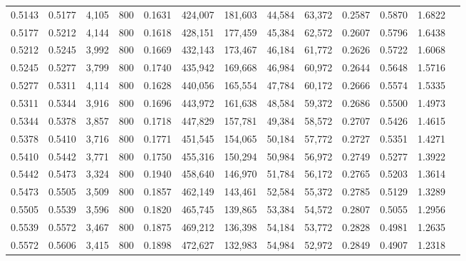 \begin{tabular}{rrrrrrrrrrrrr}
0.5143 & 0.5177 &  4,105 & 800 &                                     0.1631 & 424,007 & 181,603 &  44,584 &  63,372 & 0.2587 & 0.5870 & 1.6822 \\
0.5177 & 0.5212 &  4,144 & 800 &                                     0.1618 & 428,151 & 177,459 &  45,384 &  62,572 & 0.2607 & 0.5796 & 1.6438 \\
0.5212 & 0.5245 &  3,992 & 800 &                                     0.1669 & 432,143 & 173,467 &  46,184 &  61,772 & 0.2626 & 0.5722 & 1.6068 \\
0.5245 & 0.5277 &  3,799 & 800 &                                     0.1740 & 435,942 & 169,668 &  46,984 &  60,972 & 0.2644 & 0.5648 & 1.5716 \\
0.5277 & 0.5311 &  4,114 & 800 &                                     0.1628 & 440,056 & 165,554 &  47,784 &  60,172 & 0.2666 & 0.5574 & 1.5335 \\
0.5311 & 0.5344 &  3,916 & 800 &                                     0.1696 & 443,972 & 161,638 &  48,584 &  59,372 & 0.2686 & 0.5500 & 1.4973 \\
0.5344 & 0.5378 &  3,857 & 800 &                                     0.1718 & 447,829 & 157,781 &  49,384 &  58,572 & 0.2707 & 0.5426 & 1.4615 \\
0.5378 & 0.5410 &  3,716 & 800 &                                     0.1771 & 451,545 & 154,065 &  50,184 &  57,772 & 0.2727 & 0.5351 & 1.4271 \\
0.5410 & 0.5442 &  3,771 & 800 &                                     0.1750 & 455,316 & 150,294 &  50,984 &  56,972 & 0.2749 & 0.5277 & 1.3922 \\
0.5442 & 0.5473 &  3,324 & 800 &                                     0.1940 & 458,640 & 146,970 &  51,784 &  56,172 & 0.2765 & 0.5203 & 1.3614 \\
0.5473 & 0.5505 &  3,509 & 800 &                                     0.1857 & 462,149 & 143,461 &  52,584 &  55,372 & 0.2785 & 0.5129 & 1.3289 \\
0.5505 & 0.5539 &  3,596 & 800 &                                     0.1820 & 465,745 & 139,865 &  53,384 &  54,572 & 0.2807 & 0.5055 & 1.2956 \\
0.5539 & 0.5572 &  3,467 & 800 &                                     0.1875 & 469,212 & 136,398 &  54,184 &  53,772 & 0.2828 & 0.4981 & 1.2635 \\
0.5572 & 0.5606 &  3,415 & 800 &                                     0.1898 & 472,627 & 132,983 &  54,984 &  52,972 & 0.2849 & 0.4907 & 1.2318 \\

\end{tabular}
